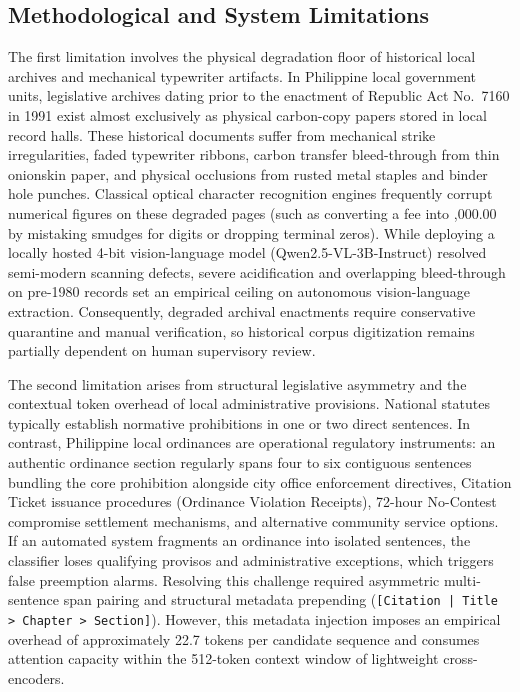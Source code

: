 \subsection{Methodological and System Limitations}
\label{sec:limitations}

The first limitation involves the physical degradation floor of historical local archives and mechanical typewriter artifacts. In Philippine local government units, legislative archives dating prior to the enactment of Republic Act No.~7160 in 1991 exist almost exclusively as physical carbon-copy papers stored in local record halls. These historical documents suffer from mechanical strike irregularities, faded typewriter ribbons, carbon transfer bleed-through from thin onionskin paper, and physical occlusions from rusted metal staples and binder hole punches. Classical optical character recognition engines frequently corrupt numerical figures on these degraded pages (such as converting a  fee into ,000.00 by mistaking smudges for digits or dropping terminal zeros). While deploying a locally hosted 4-bit vision-language model (Qwen2.5-VL-3B-Instruct) resolved semi-modern scanning defects, severe acidification and overlapping bleed-through on pre-1980 records set an empirical ceiling on autonomous vision-language extraction. Consequently, degraded archival enactments require conservative quarantine and manual verification, so historical corpus digitization remains partially dependent on human supervisory review.

The second limitation arises from structural legislative asymmetry and the contextual token overhead of local administrative provisions. National statutes typically establish normative prohibitions in one or two direct sentences. In contrast, Philippine local ordinances are operational regulatory instruments: an authentic ordinance section regularly spans four to six contiguous sentences bundling the core prohibition alongside city office enforcement directives, Citation Ticket issuance procedures (Ordinance Violation Receipts), 72-hour No-Contest compromise settlement mechanisms, and alternative community service options. If an automated system fragments an ordinance into isolated sentences, the classifier loses qualifying provisos and administrative exceptions, which triggers false preemption alarms. Resolving this challenge required asymmetric multi-sentence span pairing and structural metadata prepending (\texttt{[Citation | Title > Chapter > Section]}). However, this metadata injection imposes an empirical overhead of approximately 22.7 tokens per candidate sequence and consumes attention capacity within the 512-token context window of lightweight cross-encoders.


